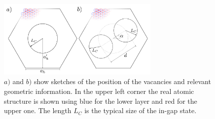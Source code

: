 \begin{figure}[h!]
\centering
\includegraphics[width=0.7\textwidth]{artlat/fig/vacs_sketch.pdf}
\vspace{-10pt}
\caption{$a)$ and $b)$ show sketches of the position of the vacancies and relevant geometric information. In the upper left corner the real atomic structure is shown using blue for the lower layer and red for the upper one. The length $L_C$ is the typical size of the in-gap state.} %
\label{geo_sketch}
\end{figure}
\FloatBarrier




